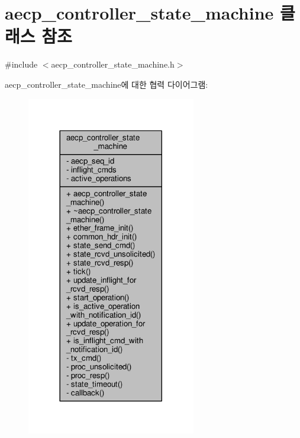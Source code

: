 \hypertarget{classavdecc__lib_1_1aecp__controller__state__machine}{}\section{aecp\+\_\+controller\+\_\+state\+\_\+machine 클래스 참조}
\label{classavdecc__lib_1_1aecp__controller__state__machine}


{\ttfamily \#include $<$aecp\+\_\+controller\+\_\+state\+\_\+machine.\+h$>$}



aecp\+\_\+controller\+\_\+state\+\_\+machine에 대한 협력 다이어그램\+:
\nopagebreak
\begin{figure}[H]
\begin{center}
\leavevmode
\includegraphics[width=209pt]{classavdecc__lib_1_1aecp__controller__state__machine__coll__graph}
\end{center}
\end{figure}
